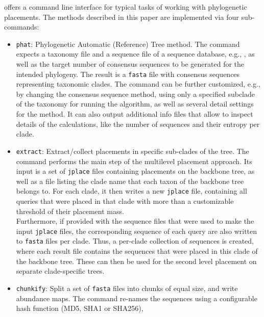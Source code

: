  offers a command line interface for typical tasks of working with phylogenetic placements.
The methods described in this paper are implemented via four sub-commands:

\begin{itemize}
    \item \texttt{phat}: Phylogenetic Automatic (Reference) Tree method.
          The command expects a taxonomy file and a sequence file of a sequence database,
          e.g.,  \citep{Quast2013,Yilmaz2014},
          as well as the target number of consensus sequences to be generated for the intended phylogeny.
          The result is a \texttt{fasta} file with consensus sequences representing taxonomic clades.
          The command can be further customized, e.g., by changing the consensus sequence method,
          using only a specified subclade of the taxonomy for running the algorithm,
          as well as several detail settings for the method.
          It can also output additional info files that allow to inspect details of the calculations,
          like the number of sequences and their entropy per clade.
    \item \texttt{extract}: Extract/collect placements in specific sub-clades of the tree.
          The command performs the main step of the multilevel placement approach.
          Its input is a set of \texttt{jplace} files containing placements on the backbone tree,
          as well as a file listing the clade name that each taxon of the backbone tree belongs to.
          For each clade, it then writes a new \texttt{jplace} file,
          containing all queries that were placed in that clade with more than a customizable threshold
          of their placement mass.
          \\
          Furthermore, if provided with the sequence files that were used to make the input \texttt{jplace} files,
          the corresponding sequence of each query are also written to \texttt{fasta} files per clade.
          Thus, a per-clade collection of sequences is created, where each result file contains the sequences
          that were placed in this clade of the backbone tree.
          These can then be used for the second level placement on separate clade-specific trees.
    \item \texttt{chunkify}: Split a set of \texttt{fasta} files into chunks of equal size,
          and write abundance maps.
          The command re-names the sequences using a configurable hash function (MD5, SHA1 or SHA256),

\end{itemize}

